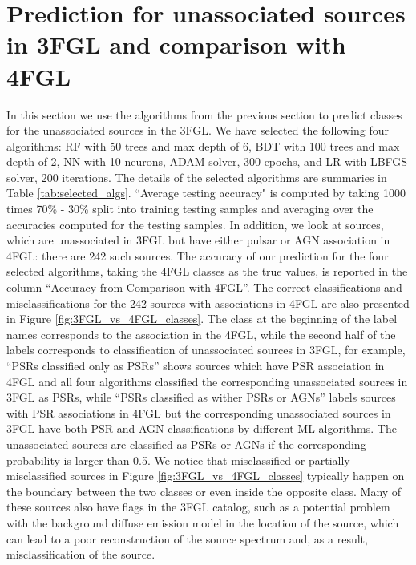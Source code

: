 \section{Prediction for unassociated sources in 3FGL and comparison with 4FGL}


In this section we use the algorithms from the previous section to predict classes for the unassociated sources in the 3FGL. 
We have selected the following four algorithms: RF with 50 trees and max depth of 6, BDT with 100 trees and max depth of 2, NN with 10 neurons, ADAM solver, 300 epochs, and LR with LBFGS solver, 200 iterations.
The details of the selected algorithms are summaries in Table \ref{tab:selected_algs}.
``Average testing accuracy" is computed by taking 1000 times 70\% - 30\% split into training testing samples and averaging over the 
accuracies computed for the testing samples.
In addition, we look at sources, which are unassociated in 3FGL but have either pulsar or AGN association in 4FGL: there are 242 such sources.
The accuracy of our prediction for the four selected algorithms, taking the 4FGL classes as the true values, is reported in the column ``Accuracy from Comparison with 4FGL''.
The correct classifications and misclassifications for the 242 sources with associations in 4FGL are also presented in Figure \ref{fig:3FGL_vs_4FGL_classes}.
The class at the beginning of the label names corresponds to the association in the 4FGL, while the second half of the labels corresponds to classification of unassociated sources in 3FGL, for example, ``PSRs classified only as PSRs'' shows sources which have PSR association in 4FGL and all four algorithms classified the corresponding unassociated sources in 3FGL as PSRs, while ``PSRs classified as wither PSRs or AGNs'' labels sources with PSR associations in 4FGL but the corresponding unassociated sources in 3FGL have both PSR and AGN classifications by different ML algorithms.
The unassociated sources are classified as PSRs or AGNs if the corresponding probability is larger than 0.5.
We notice that misclassified or partially misclassified sources in Figure \ref{fig:3FGL_vs_4FGL_classes} typically happen on the boundary between the two classes or even inside the opposite class.
Many of these sources also have flags in the 3FGL catalog, such as a potential problem with the background diffuse emission model in the location of the source, which can lead to a poor reconstruction of the source spectrum and, as a result, misclassification of the source.




